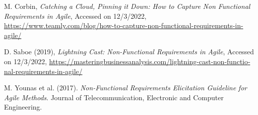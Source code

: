 {\begin{latin}
\begin{thebibliography}{9}
	M. Corbin,
	\textit{Catching a Cloud, Pinning it Down: How to Capture Non Functional Requirements in Agile},
	Accessed on 12/3/2022,
	\url{https://www.teamly.com/blog/how-to-capture-non-functional-requirements-in-agile/}
	
	 D. Saboe (2019),
	 \textit{Lightning Cast: Non-Functional Requirements in Agile},
	 Accessed on 12/3/2022,
	 \url{https://masteringbusinessanalysis.com/lightning-cast-non-functional-requirements-in-agile/}
	 
	 	  

	M. Younas et al. (2017).
	\textit{Non-Functional Requirements Elicitation Guideline for Agile Methods}. Journal of Telecommunication, Electronic and Computer Engineering.
	 

	  

	  
	  
	 
	 
	
	
\end{thebibliography}
\endgroup
\end{latin}

}
